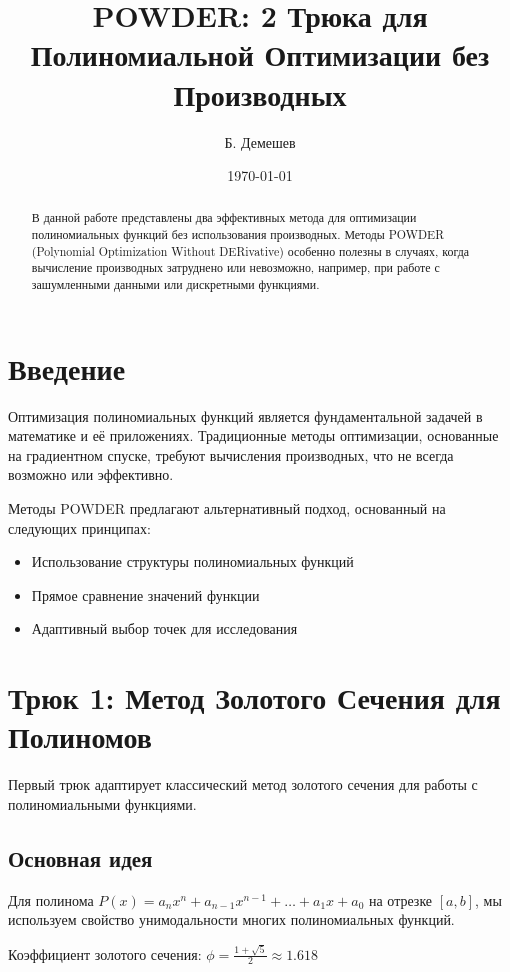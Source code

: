 \documentclass[12pt,a4paper]{article}
\title{POWDER: 2 Трюка для Полиномиальной Оптимизации без Производных}
\author{Б. Демешев}
\date{\today}
\begin{document}
\maketitle

\begin{abstract}
В данной работе представлены два эффективных метода для оптимизации полиномиальных функций без использования производных. Методы POWDER (Polynomial Optimization Without DERivative) особенно полезны в случаях, когда вычисление производных затруднено или невозможно, например, при работе с зашумленными данными или дискретными функциями.
\end{abstract}

\section{Введение}

Оптимизация полиномиальных функций является фундаментальной задачей в математике и её приложениях. Традиционные методы оптимизации, основанные на градиентном спуске, требуют вычисления производных, что не всегда возможно или эффективно.

Методы POWDER предлагают альтернативный подход, основанный на следующих принципах:
\begin{itemize}
    \item Использование структуры полиномиальных функций
    \item Прямое сравнение значений функции
    \item Адаптивный выбор точек для исследования
\end{itemize}

\section{Трюк 1: Метод Золотого Сечения для Полиномов}

Первый трюк адаптирует классический метод золотого сечения для работы с полиномиальными функциями.

\subsection{Основная идея}

Для полинома $P(x) = a_n x^n + a_{n-1} x^{n-1} + \ldots + a_1 x + a_0$ на отрезке $[a, b]$, мы используем свойство унимодальности многих полиномиальных функций.

Коэффициент золотого сечения: $\phi = \frac{1 + \sqrt{5}}{2} \approx 1.618$
\end{document}
